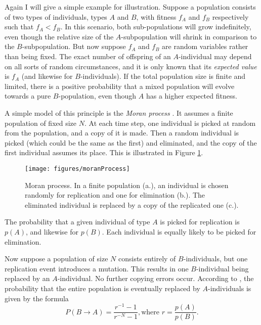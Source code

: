 \documentclass[output=paper,hidelinks]{langscibook}
\begin{document}
Again I will give a simple example for illustration. Suppose a population consists of two
types of individuals, types $A$ and $B$, with fitness $f_A$ and $f_B$ respectively such
that $f_A < f_B$. In this scenario, both sub-populations will grow indefinitely, even
though the relative size of the $A$-subpopulation will shrink in comparison to the
$B$-subpopulation. But now suppose $f_A$ and $f_B$ are random variables rather than being
fixed. The exact number of offspring of an $A$-individual may depend on all sorts of
random circumstances, and it is only known that its \emph{expected value} is $f_A$ (and
likewise for $B$-individuals). If the total population size is finite and limited, there
is a positive probability that a mixed population will evolve towards a pure
$B$-population, even though $A$ has a higher expected fitness.

A simple model of this principle is the \emph{Moran process} \citep{moran58}. It assumes a
finite population of fixed size $N$. At each time step, one individual is picked at random
from the population, and a copy of it is made. Then a random individual is picked (which
could be the same as the first) and eliminated, and the copy of the first individual
assumes its place. This is illustrated in Figure \ref{fig:4}.

\begin{figure}
  \centering
  \texttt{[image: figures/moranProcess]}
  \caption{Moran process. In a finite population (a.), an individual is chosen randomly
    for replication and one for elimination (b.). The eliminated individual is replaced by
    a copy of the replicated one (c.).}
  \label{fig:4}
\end{figure}

The probability that a given individual of type $A$ is picked for replication is $p(A)$, and
likewise for $p(B)$. Each individual is equally likely to be picked for elimination.

Now suppose a population of size $N$ consists entirely of $B$-individuals, but one
replication event introduces a mutation. This results in one $B$-individual being replaced
by an $A$-individual. No further copying errors occur. According to \citet[101]{nowak06},
the probability that the entire population is eventually replaced by $A$-individuals is
given by the formula
\begin{equation*}
  \label{eq:3}
  P(B\rightarrow A) = \frac{r^{-1} -1}{r^{-N}-1}, \mbox{where } r = \frac{p(A)}{p(B)}.
\end{equation*}
\end{document}
